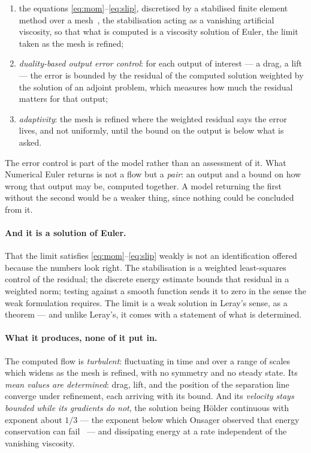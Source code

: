 \documentclass[11pt]{article}
\begin{document}
\begin{enumerate}
\item the equations \eqref{eq:mom}--\eqref{eq:slip}, discretised by a stabilised finite element
method over a mesh~\cite{book}, the stabilisation acting as a vanishing artificial viscosity, so that
what is computed is a viscosity solution of Euler, the limit taken as the mesh is refined;
\item \emph{duality-based output error control}: for each output of interest --- a drag, a lift ---
the error is bounded by the residual of the computed solution weighted by the solution of an adjoint
problem, which measures how much the residual matters for that output;
\item \emph{adaptivity}: the mesh is refined where the weighted residual says the error lives, and
not uniformly, until the bound on the output is below what is asked.
\end{enumerate}

The error control is part of the model rather than an assessment of it. What Numerical Euler returns
is not a flow but a \emph{pair}: an output and a bound on how wrong that output may be, computed
together. A model returning the first without the second would be a weaker thing, since nothing could
be concluded from it.

\paragraph{And it is a solution of Euler.} That the limit satisfies
\eqref{eq:mom}--\eqref{eq:slip} weakly is not an identification offered because the numbers look
right. The stabilisation is a weighted least-squares control of the residual; the discrete energy
estimate bounds that residual in a weighted norm; testing against a smooth function sends it to zero
in the sense the weak formulation requires. The limit is a weak solution in Leray's sense, as a
theorem --- and unlike Leray's, it comes with a statement of what is determined.

\paragraph{What it produces, none of it put in.} The computed flow is \emph{turbulent}: fluctuating
in time and over a range of scales which widens as the mesh is refined, with no symmetry and no
steady state. Its \emph{mean values are determined}: drag, lift, and the position of the separation
line converge under refinement, each arriving with its bound. And its \emph{velocity stays bounded
while its gradients do not}, the solution being H\"older continuous with exponent about $1/3$ --- the
exponent below which Onsager observed that energy conservation can fail~\cite{onsager} --- and
dissipating energy at a rate independent of the vanishing viscosity.
\end{document}
